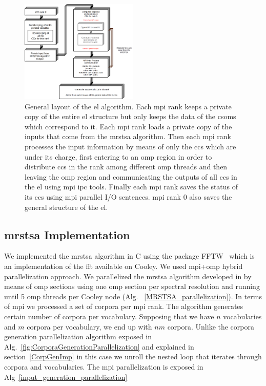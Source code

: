 \documentclass[10pt,journal,compsoc]{IEEEtran}
\begin{document}
\begin{figure}[h!]
    \centering
    \includegraphics[width=0.5\textwidth]{EL_ALG.png}
    \caption{General layout of the \gls{el} algorithm. Each \gls{mpi} rank keeps a private copy of the entire \gls{el} structure but only keeps the data of the \glspl{csom} which correspond to it. Each \gls{mpi} rank loads a private copy of the inputs that come from the \gls{mrstsa} algorithm. Then each \gls{mpi} rank processes the input information by means of only the \glspl{cc} which are under its charge, first entering to an \gls{omp} region in order to distribute \glspl{cc} in the rank among different \gls{omp} threads and then leaving the \gls{omp} region and communicating the outputs of all \glspl{cc} in the \gls{el} using \gls{mpi} \gls{ipc} tools. Finally each \gls{mpi} rank saves the status of its \glspl{cc} using \gls{mpi} parallel I/O sentences. \gls{mpi} rank 0 also saves the general structure of the \gls{el}.} 
    \label{fig:EL_ALG}
\end{figure}









\subsection{\gls{mrstsa} Implementation}

We implemented the \gls{mrstsa} algorithm in C using the package FFTW~\cite{fftw} which is an implementation of the \gls{fft} available on Cooley. We used \gls{mpi}+\gls{omp} hybrid parallelization approach. We parallelized the \gls{mrstsa} algorithm developed in \cite{Dematties2018} by means of \gls{omp} sections using one \gls{omp} section per spectral resolution and running until 5 \gls{omp} threads per Cooley node (Alg. ~\ref{MRSTSA_parallelization}). In terms of \gls{mpi} we processed a set of corpora per \gls{mpi} rank. The algorithm generates certain number of corpora per vocabulary. Supposing that we have $n$ vocabularies and $m$ corpora per vocabulary, we end up with $n m$ corpora. Unlike the corpora generation parallelization algorithm exposed in Alg.~\ref{fig:CorporaGenerationParallelization} and explained in section~\ref{CorpGenImp} in this case we unroll the nested loop that iterates through corpora and vocabularies. The \gls{mpi} parallelization is exposed in Alg~\ref{input_generation_parallelization}
\end{document}
